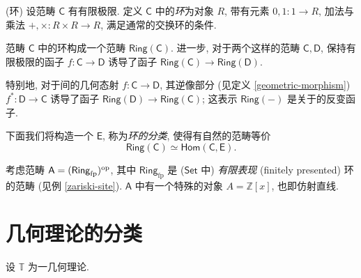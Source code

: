 \begin{definition}
    {(环)}
    设范畴 $\mathsf C$ 有有限极限.
    定义 $\mathsf C$ 中的\emph{环}为对象 $R$,
    带有元素 $0,1\colon 1 \to R$,
    加法与乘法 $+,\times \colon R\times R \to R$,
    满足通常的交换环的条件.

    范畴 $\mathsf C$ 中的环构成一个范畴 $\mathsf {Ring}(\mathsf C)$.
    进一步, 对于两个这样的范畴 $\mathsf C,\mathsf D$, 保持有限极限的函子 $f \colon \mathsf C \to \mathsf D$ 诱导了函子
    $\mathsf {Ring}(\mathsf C) \to \mathsf {Ring}(\mathsf D)$.

    特别地, 对于\topos{}间的几何态射 $f \colon \mathsf C \to \mathsf D$, 其逆像部分 (见定义 \ref{geometric-morphism}) $f^* \colon \mathsf D \to \mathsf C$ 诱导了函子 $\mathsf {Ring}(\mathsf D) \to \mathsf {Ring}(\mathsf C)$;
    这表示 $\mathsf {Ring}(-)$ 是关于\topos{}的反变函子.
\end{definition}

下面我们将构造一个\topos{} $\mathsf E$, 称为\emph{环的分类\topos{}}, 使得有自然的范畴等价
$$
\mathsf {Ring}(\mathsf C) \simeq \mathsf{Hom}(\mathsf C,\mathsf E).
$$



考虑范畴 $\mathsf A = (\mathsf {Ring}_{\text{fp}})^{\text{op}}$,
其中 $\mathsf {Ring}_{\text{fp}}$ 是 ($\mathsf{Set}$ 中) \emph{有限表现} (finitely presented) 环的范畴 (见例 \ref{zariski-site}).
$\mathsf A$ 中有一个特殊的对象 $A = \mathbb{Z}[x]$,
也即仿射直线.

\section{几何理论的分类\topos{}}

\begin{definition}
    {}
    设 $\mathbb T$ 为一几何理论.
    
\end{definition}